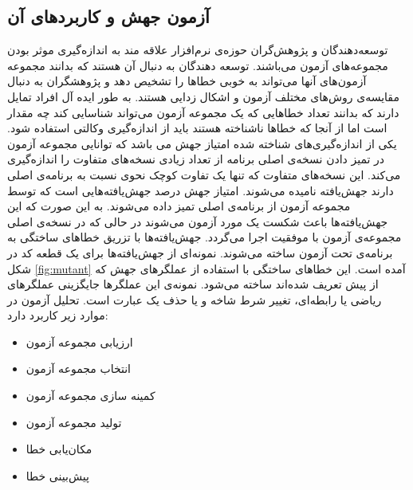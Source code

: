
\subsection{آزمون جهش و کاربردهای آن}
توسعه‌دهندگان و پژوهش‌گران حوزه‌ی نرم‌افزار علاقه مند به اندازه‌گیری موثر بودن مجموعه‌های آزمون می‌باشند. توسعه دهندگان به دنبال آن هستند که بدانند مجموعه آزمون‌های آنها می‌تواند به خوبی خطاها را تشخیص دهد و پژوهشگران به دنبال مقایسه‌ی روش‌های مختلف آزمون و اشکال زدایی  هستند. به طور ایده آل افراد تمایل دارند که بدانند تعداد خطاهایی که یک مجموعه آزمون می‌تواند شناسایی کند چه مقدار است اما از آنجا که خطاها ناشناخته هستند باید از اندازه‌گیری  وکالتی استفاده شود. یکی از اندازه‌‌‌گیری‌های شناخته شده امتیاز جهش  می‌ باشد که توانایی مجموعه آزمون در تمیز دادن نسخه‌ی اصلی برنامه از تعداد زیادی نسخه‌های متفاوت را اندازه‌گیری می‌کند. این نسخه‌های متفاوت که تنها یک تفاوت کوچک نحوی نسبت به برنامه‌ی اصلی دارند جهش‌یافته نامیده می‌شوند. امتیاز جهش درصد جهش‌یافته‌هایی  است که توسط مجموعه آزمون از برنامه‌ی اصلی تمیز داده می‌شوند. به این صورت که این جهش‌یافته‌ها باعث شکست یک مورد آزمون می‌شوند در حالی که در نسخه‌ی اصلی مجموعه‌ی آزمون با موفقیت اجرا می‌گردد. جهش‌یافته‌ها با تزریق خطاهای ساختگی به برنامه‌ی تحت آزمون  ساخته می‌شوند.  نمونه‌ای از  جهش‌یافته‌ها  برای یک قطعه کد در شکل \ref{fig:mutant} آمده است. این خطاهای ساختگی با استفاده از عملگرهای جهش که از پیش تعریف شده‌اند ساخته می‌شود. نمونه‌ی این عملگرها جایگزینی عملگرهای ریاضی یا رابطه‌ای، تغییر شرط شاخه  و یا حذف یک عبارت است\cite{just2014mutants}. تحلیل آزمون در موارد زیر کاربرد دارد:
\begin{itemize}
	\setlength\itemsep{.01em}	
	\item 
	ارزیابی مجموعه آزمون
	\item 
	انتخاب مجموعه آزمون
	\item 
	 کمینه سازی مجموعه آزمون
	\item 
	 تولید مجموعه آزمون
	\item 
	مکان‌یابی خطا
	\item 
	پیش‌بینی خطا
\end{itemize}

